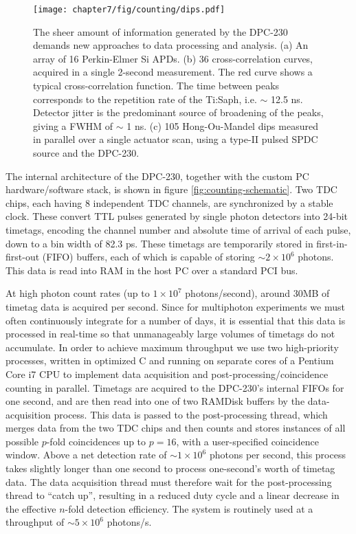 \begin{figure}[t!]
\centering
\texttt{[image: chapter7/fig/counting/dips.pdf]}
\caption[Representative data from the DPC-230]{
 The sheer amount of information generated by the DPC-230 demands new approaches to data processing and analysis. (a) An array of 16 Perkin-Elmer Si APDs. (b) 36 cross-correlation curves, acquired in a single 2-second measurement. The red curve shows a typical cross-correlation function. The time between peaks corresponds to the repetition rate of the Ti:Saph, i.e. $\sim$ 12.5 ns. Detector jitter is the predominant source of broadening of the peaks, giving a FWHM of $\sim$ 1 ns. (c) 105 Hong-Ou-Mandel dips measured in parallel over a single actuator scan, using a type-II pulsed SPDC source and the DPC-230.
}
\label{fig:counting-representative-data}
\end{figure}
The internal architecture of the DPC-230, together with the custom PC \linebreak hardware/software stack, is shown in figure \ref{fig:counting-schematic}. Two TDC chips, each having 8 independent TDC channels, are synchronized by a stable clock. These convert TTL pulses generated by single photon detectors into 24-bit timetags, encoding the channel number and absolute time of arrival of each pulse, down to a bin width of 82.3 ps. These timetags are temporarily stored in first-in-first-out (FIFO) buffers, each of which is capable of storing $\sim 2\times10^6$ photons. This data is read into RAM in the host PC over a standard PCI bus.  

At high photon count rates (up to $1\times 10^7$ photons/second), around 30MB of timetag data is acquired per second. Since for multiphoton experiments we must often continuously integrate for a number of days, it is essential that this data is processed in real-time so that unmanageably large volumes of timetags do not accumulate. In order to achieve maximum throughput we use two high-priority processes, written in optimized C and running on separate cores of a Pentium Core i7 CPU to implement data acquisition and post-processing/coincidence counting in parallel. Timetags are acquired to the DPC-230's internal FIFOs for one second, and are then read into one of two RAMDisk buffers by the data-acquisition process. This data is passed to the post-processing thread, which merges data from the two TDC chips and then counts and stores instances of all possible $p$-fold coincidences up to $p=16$, with a user-specified coincidence window. Above a net detection rate of $\sim1\times 10^6$ photons per second, this process takes slightly longer than one second to process one-second's worth of timetag data. The data acquisition thread must therefore wait for the post-processing thread to ``catch up'', resulting in a reduced duty cycle and a linear decrease in the effective $n$-fold detection efficiency. The system is routinely used at a throughput of $\sim 5\times 10^6$ photons/s.

